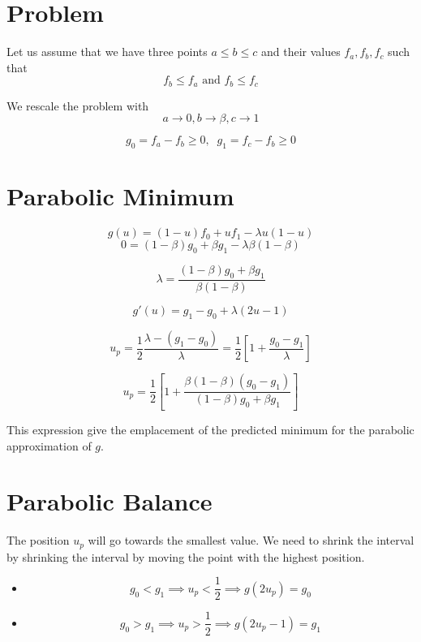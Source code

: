 \documentclass[aps,12pt]{revtex4}
\begin{document}
\section{Problem}
Let us assume that we have three points $a\leq b \leq c$ and their values
$f_a,f_b,f_c$ such that
\begin{equation}
	f_b \leq f_a \text{ and } f_b \leq f_c
\end{equation} 

We rescale the problem with
$$
	a \to 0, b \to \beta, c \to 1
$$	

$$
	g_0 = f_a - f_b \geq 0, \;\; g_1 = f_c - f_b \geq 0
$$

\section{Parabolic Minimum}
$$
	g(u) = (1-u) f_0 + u f_1 - \lambda u(1-u)
$$
$$
	0 = (1-\beta) g_0 + \beta g_1 - \lambda \beta(1-\beta)
$$

$$
	\lambda = \dfrac{(1-\beta) g_0 + \beta g_1 }{\beta(1-\beta)}
$$

$$
	g'(u) = g_1-g_0 + \lambda (2u-1)
$$

$$
	u_p = \dfrac{1}{2} \dfrac{\lambda - (g_1-g_0)}{\lambda} = \dfrac{1}{2}\left[ 1 + \dfrac{g_0-g_1}{\lambda} \right]
$$

$$
	u_p = \frac{1}{2} \left[ 1 + \dfrac{ \beta(1-\beta) (g_0-g_1) }{ (1-\beta) g_0 + \beta g_1 } \right]
$$

This expression give the emplacement of the predicted minimum for the parabolic approximation of $g$.

\section{Parabolic Balance}

The position $u_p$ will go towards the smallest value. We need to shrink the interval by shrinking the interval by moving
the point with the highest position.

\begin{itemize}
\item 
$$g_0<g_1 \implies u_p < \frac{1}{2} \implies g(2u_p) = g_0$$
\item
$$g_0>g_1 \implies u_p > \frac{1}{2} \implies g(2u_p-1) = g_1$$
\end{itemize}
\end{document}
